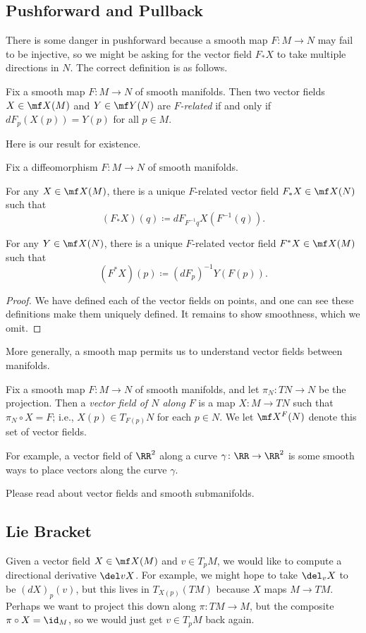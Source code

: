 \documentclass[../notes.tex]{subfiles}
\begin{document}
\subsection{Pushforward and Pullback}
There is some danger in pushforward because a smooth map $F\colon M\to N$ may fail to be injective, so we might be asking for the vector field $F_*X$ to take multiple directions in $N$. The correct definition is as follows.
\begin{definition}
	Fix a smooth map $F\colon M\to N$ of smooth manifolds. Then two vector fields $X\in\mf X(M)$ and $Y\in\mf Y(N)$ are \textit{$F$-related} if and only if $dF_p(X(p))=Y(p)$ for all $p\in M$.
\end{definition}
Here is our result for existence.
\begin{proposition}
	Fix a diffeomorphism $F\colon M\to N$ of smooth manifolds.
	\begin{listalph}
		\item For any $X\in\mf X(M)$, there is a unique $F$-related vector field $F_*X\in\mf X(N)$ such that
		\[(F_*X)(q)\coloneqq dF_{F^{-1}q}X(F^{-1}(q)).\]
		\item For any $Y\in\mf X(N)$, there is a unique $F$-related vector field $F^*X\in\mf X(M)$ such that
		\[(F^*X)(p)\coloneqq(dF_p)^{-1}Y(F(p)).\]
	\end{listalph}
\end{proposition}
\begin{proof}
	We have defined each of the vector fields on points, and one can see these definitions make them uniquely defined. It remains to show smoothness, which we omit.
\end{proof}
More generally, a smooth map permits us to understand vector fields between manifolds.
\begin{definition}
	Fix a smooth map $F\colon M\to N$ of smooth manifolds, and let $\pi_N\colon TN\to N$ be the projection. Then a \textit{vector field of $N$ along $F$} is a map $X\colon M\to TN$ such that $\pi_N\circ X=F$; i.e., $X(p)\in T_{F(p)}N$ for each $p\in N$. We let $\mf X^F(N)$ denote this set of vector fields.
\end{definition}
For example, a vector field of $\RR^2$ along a curve $\gamma\colon\RR\to\RR^2$ is some smooth ways to place vectors along the curve $\gamma$.
\begin{remark}
	Please read about vector fields and smooth submanifolds.
\end{remark}

\subsection{Lie Bracket}
Given a vector field $X\in\mf X(M)$ and $v\in T_pM$, we would like to compute a directional derivative $\del vX$. For example, we might hope to take $\del_vX$ to be $(dX)_p(v)$, but this lives in $T_{X(p)}(TM)$ because $X$ maps $M\to TM$. Perhaps we want to project this down along $\pi\colon TM\to M$, but the composite $\pi\circ X=\id_M$, so we would just get $v\in T_pM$ back again.
\end{document}
